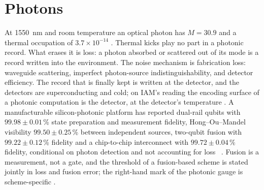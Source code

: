\section{Photons}\label{sec:qp_photon}
At 1550~nm and room temperature an optical photon has $M=30.9$ and a thermal occupation of $3.7\times10^{-14}$ \calc. Thermal kicks play no
part in a photonic record. What erases it is loss: a photon absorbed or scattered out of its mode is a record written into the environment.
The noise mechanism is fabrication loss: waveguide scattering, imperfect photon-source indistinguishability, and detector efficiency. The record that is finally kept is written at the detector, and the
detectors are superconducting and cold; on IAM's reading the encoding surface of a photonic computation is the detector, at the detector's
temperature \interp. A manufacturable silicon-photonic platform has reported dual-rail qubits with $99.98\pm0.01$\,\% state preparation and
measurement fidelity, Hong--Ou--Mandel visibility $99.50\pm0.25$\,\% between independent sources, two-qubit fusion with $99.22\pm0.12$\,\%
fidelity and a chip-to-chip interconnect with $99.72\pm0.04$\,\% fidelity, conditional on photon detection and not accounting for
loss~\cite{PsiQuantum2025} \observed. Fusion is a measurement, not a gate, and the threshold of a fusion-based scheme is stated jointly in
loss and fusion error; the right-hand mark of the photonic gauge is scheme-specific \openprob.

